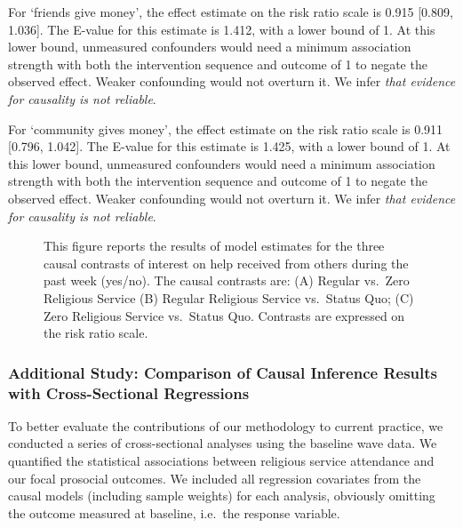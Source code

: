 \documentclass[
  single column]{article}
\begin{document}
For `friends give money', the effect estimate on the risk ratio scale is
0.915 {[}0.809, 1.036{]}. The E-value for this estimate is 1.412, with a
lower bound of 1. At this lower bound, unmeasured confounders would need
a minimum association strength with both the intervention sequence and
outcome of 1 to negate the observed effect. Weaker confounding would not
overturn it. We infer \emph{that evidence for causality is not
reliable}.

For `community gives money', the effect estimate on the risk ratio scale
is 0.911 {[}0.796, 1.042{]}. The E-value for this estimate is 1.425,
with a lower bound of 1. At this lower bound, unmeasured confounders
would need a minimum association strength with both the intervention
sequence and outcome of 1 to negate the observed effect. Weaker
confounding would not overturn it. We infer \emph{that evidence for
causality is not reliable}.

\begin{figure}


\caption{\label{fig-study_3}This figure reports the results of model
estimates for the three causal contrasts of interest on help received
from others during the past week (yes/no). The causal contrasts are: (A)
Regular vs.~Zero Religious Service (B) Regular Religious Service
vs.~Status Quo; (C) Zero Religious Service vs.~Status Quo. Contrasts are
expressed on the risk ratio scale.}

\end{figure}%

\newpage{}

\subsubsection{Additional Study: Comparison of Causal Inference Results
with Cross-Sectional
Regressions}\label{additional-study-comparison-of-causal-inference-results-with-cross-sectional-regressions}

To better evaluate the contributions of our methodology to current
practice, we conducted a series of cross-sectional analyses using the
baseline wave data. We quantified the statistical associations between
religious service attendance and our focal prosocial outcomes. We
included all regression covariates from the causal models (including
sample weights) for each analysis, obviously omitting the outcome
measured at baseline, i.e.~the response variable.
\end{document}
